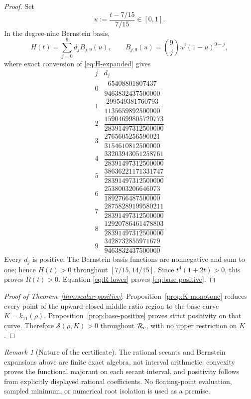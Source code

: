 \documentclass[11pt]{article}
\theoremstyle{remark}
\newtheorem{remark}[theorem]{Remark}
\begin{document}
\begin{proof}
Set
\[
 u:=\frac{t-7/15}{7/15}\in[0,1].
 \]
In the degree-nine Bernstein basis,
\begin{equation}
 H(t)=\sum_{j=0}^9 d_jB_{j,9}(u),
 \qquad
 B_{j,9}(u)=\binom9j u^j(1-u)^{9-j},
 \label{eq:H-Bernstein}
\end{equation}
where exact conversion of \eqref{eq:H-expanded} gives
\begin{equation}
 \begin{array}{c|c}
 j&d_j\\ \hline
 0&\dfrac{65408801807437}{9463832437500000}\\[3pt]
 1&\dfrac{299549381760793}{1135659892500000}\\[3pt]
 2&\dfrac{15904699805720773}{28391497312500000}\\[3pt]
 3&\dfrac{2765605256590021}{3154610812500000}\\[3pt]
 4&\dfrac{33203943051258761}{28391497312500000}\\[3pt]
 5&\dfrac{38636221171331747}{28391497312500000}\\[3pt]
 6&\dfrac{2538003206646073}{1892766487500000}\\[3pt]
 7&\dfrac{28758289199580211}{28391497312500000}\\[3pt]
 8&\dfrac{12920786461478803}{28391497312500000}\\[3pt]
 9&\dfrac{3428732855971679}{9463832437500000}
 \end{array}
 \label{eq:H-coefficients}
\end{equation}
Every \(d_j\) is positive.  The Bernstein basis functions are
nonnegative and sum to one; hence \(H(t)>0\) throughout
\([7/15,14/15]\).  Since \(t^4(1+2t)>0\), this proves \(R(t)>0\).
Equation \eqref{eq:R-lower} proves \eqref{eq:base-positive}.
\end{proof}

\begin{proof}[Proof of Theorem~\ref{thm:scalar-positive}]
Proposition~\ref{prop:K-monotone} reduces every point of
the upward-closed middle-ratio region to the base curve
\(K=k_{11}(\rho)\).
Proposition~\ref{prop:base-positive} proves strict positivity on that
curve.  Therefore \(\mathcal S(\rho,K)>0\) throughout
\(\mathcal R_{\rm c}\), with no upper restriction on \(K\).
\end{proof}

\begin{remark}[Nature of the certificate]
The rational secants and Bernstein expansions above are finite exact
algebra, not interval arithmetic: convexity proves the functional
majorant on each secant interval, and positivity follows from explicitly
displayed rational coefficients.  No floating-point evaluation, sampled
minimum, or numerical root isolation is used as a premise.
\end{remark}
\end{document}

